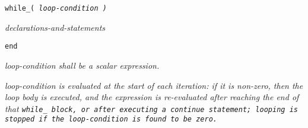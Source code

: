 
\tt{while}\_\s\tt{(} \it{loop-condition} \tt{)}

\s\s\s\s\it{declarations-and-statements}\opt

\tt{end}


\it{loop-condition} shall be a scalar expression.


\it{loop-condition} is evaluated at the start of each iteration:
if it is non-zero, then the loop body is executed, and the expression
is re-evaluated after reaching the end of that \tt{while_} block,
or after executing a \tt{continue} statement;
looping is stopped if the \it{loop-condition} is found to be zero.

